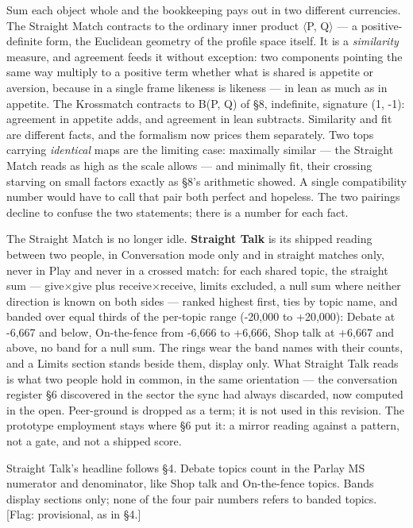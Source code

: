 Sum each object whole and the bookkeeping pays out in two different
currencies. The Straight Match contracts to the ordinary inner product
$\langle$P, Q$\rangle$ --- a positive-definite form, the Euclidean geometry of the
profile space itself. It is a \emph{similarity} measure, and agreement
feeds it without exception: two components pointing the same way
multiply to a positive term whether what is shared is appetite or
aversion, because in a single frame likeness is likeness --- in lean as
much as in appetite. The Krossmatch contracts to B(P, Q) of \S 8,
indefinite, signature (1, -1): agreement in appetite adds, and agreement
in lean subtracts. Similarity and fit are different facts, and the
formalism now prices them separately. Two tops carrying \emph{identical}
maps are the limiting case: maximally similar --- the Straight Match
reads as high as the scale allows --- and minimally fit, their crossing
starving on small factors exactly as \S 8's arithmetic showed. A single
compatibility number would have to call that pair both perfect and
hopeless. The two pairings decline to confuse the two statements; there
is a number for each fact.

The Straight Match is no longer idle. \textbf{Straight Talk} is its
shipped reading between two people, in Conversation mode only and in
straight matches only, never in Play and never in a crossed match: for
each shared topic, the straight sum --- give$\times$give plus receive$\times$receive,
limits excluded, a null sum where neither direction is known on both
sides --- ranked highest first, ties by topic name, and banded over
equal thirds of the per-topic range (-20,000 to +20,000): Debate at
-6,667 and below, On-the-fence from -6,666 to +6,666, Shop talk at
+6,667 and above, no band for a null sum. The rings wear the band names
with their counts, and a Limits section stands beside them, display
only. What Straight Talk reads is what two people hold in common, in the
same orientation --- the conversation register \S 6 discovered in the
sector the sync had always discarded, now computed in the open.
Peer-ground is dropped as a term; it is not used in this revision. The
prototype employment stays where \S 6 put it: a mirror reading against a
pattern, not a gate, and not a shipped score.

Straight Talk's headline follows \S 4. Debate topics count in the Parlay
MS numerator and denominator, like Shop talk and On-the-fence topics.
Bands display sections only; none of the four pair numbers refers to
banded topics. {[}Flag: provisional, as in \S 4.{]}

